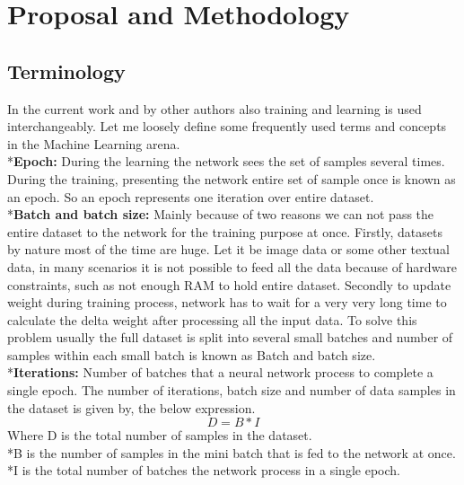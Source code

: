\chapter{Proposal and Methodology}


\section{Terminology}
In the current work and by other authors also training and learning is used interchangeably. Let me loosely define some frequently used terms and concepts in the Machine Learning arena.
\\*\textbf{Epoch:}
During the learning the network sees the set of samples several times. During the training, presenting the network entire set of sample once is known as an epoch. So an epoch represents one iteration over entire dataset.
\\*\textbf{Batch and batch size:}
Mainly because of two reasons we can not pass the entire dataset to the network for the training purpose at once. Firstly, datasets by nature most of the time are huge. Let it be image data or some other textual data, in many scenarios it is not possible to feed all the data because of hardware constraints, such as not enough RAM to hold entire dataset.
Secondly to update weight during training process, network has to wait for a very very long time to calculate the delta weight after processing all the input data. To solve this problem usually the full dataset is split into several small batches and number of samples within each small batch is known as 
Batch and batch size.
\\*\textbf{Iterations:} 
Number of batches that a neural network process to complete a single epoch.
The number of  iterations, batch size and  number of data samples in the dataset is given by, the below expression.
\begin{equation}
    D = B * I
\end{equation}
Where D is the total number of samples in the dataset.
\\*B is the number of samples in the mini batch that is fed to the network at once.
\\*I is the  total number of batches the network process in a single epoch.

